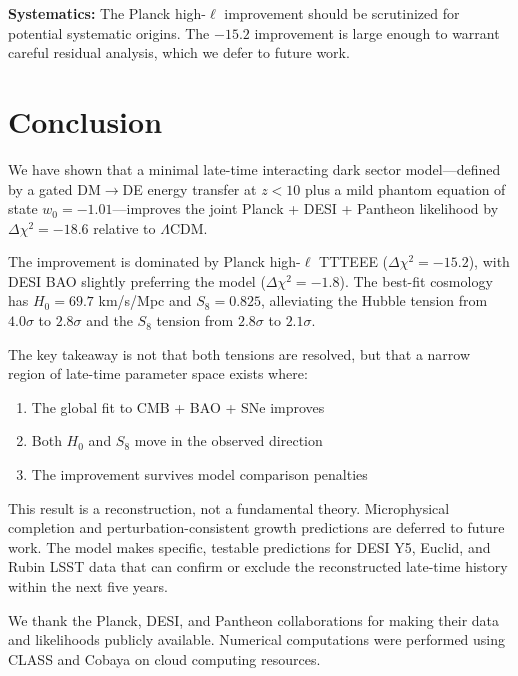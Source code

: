 \documentclass[twocolumn,showpacs,preprintnumbers,amsmath,amssymb,prd]{revtex4-2}
\begin{document}
\textbf{Systematics:} The Planck high-$\ell$ improvement should be scrutinized for potential systematic origins. The $-15.2$ improvement is large enough to warrant careful residual analysis, which we defer to future work.

\section{Conclusion}
\label{sec:conclusion}

We have shown that a minimal late-time interacting dark sector model---defined by a gated DM$\to$DE energy transfer at $z < 10$ plus a mild phantom equation of state $w_0 = -1.01$---improves the joint Planck + DESI + Pantheon likelihood by $\Delta\chi^2 = -18.6$ relative to $\Lambda$CDM.

The improvement is dominated by Planck high-$\ell$ TTTEEE ($\Delta\chi^2 = -15.2$), with DESI BAO slightly preferring the model ($\Delta\chi^2 = -1.8$). The best-fit cosmology has $H_0 = 69.7$ km/s/Mpc and $S_8 = 0.825$, alleviating the Hubble tension from $4.0\sigma$ to $2.8\sigma$ and the $S_8$ tension from $2.8\sigma$ to $2.1\sigma$.

The key takeaway is not that both tensions are resolved, but that a narrow region of late-time parameter space exists where:
\begin{enumerate}
    \item The global fit to CMB + BAO + SNe improves
    \item Both $H_0$ and $S_8$ move in the observed direction
    \item The improvement survives model comparison penalties
\end{enumerate}

This result is a reconstruction, not a fundamental theory. Microphysical completion and perturbation-consistent growth predictions are deferred to future work. The model makes specific, testable predictions for DESI Y5, Euclid, and Rubin LSST data that can confirm or exclude the reconstructed late-time history within the next five years.

\begin{acknowledgments}
We thank the Planck, DESI, and Pantheon collaborations for making their data and likelihoods publicly available. Numerical computations were performed using CLASS and Cobaya on cloud computing resources.
\end{acknowledgments}


\end{document}
